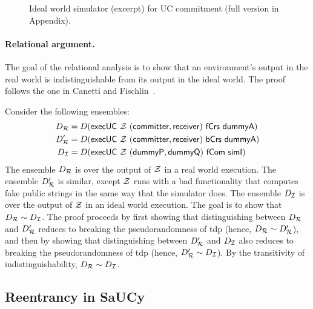 \begin{figure}

\caption{Ideal world simulator (excerpt) for UC commitment (full version in Appendix).}
\label{fig:sim-short}
\end{figure}


\paragraph{Relational argument.}
The goal of the relational analysis is to show that an environment's output in
the real world is indistinguishable from its output in the ideal world. The
proof follows the one in Canetti and Fischlin~\cite{canetti2001commitments}.

\begin{sketch}
  Consider the following ensembles:
  \begin{align*}
    D_{\mathcal{{R}}} &= D(\mathsf{execUC~\mathcal{{Z}}~(committer, receiver)~fCrs~dummyA})\\
    D_{\mathcal{{R}}}' &= D(\mathsf{execUC~\mathcal{{Z}}~(committer, receiver)~bCrs~dummyA})\\
    D_{\mathcal{{I}}} &= D(\mathsf{execUC~\mathcal{{Z}}~(dummyP, dummyQ)~fCom~simI})
  \end{align*}
  \noindent The ensemble $D_{\mathcal{{R}}}$ is over the output of $\mathcal{{Z}}$ in a real
  world execution. The ensemble $D_{\mathcal{{R}}}'$ is similar, except $\mathcal{{Z}}$ runs
  with a bad functionality that computes fake public strings in the same way
  that the simulator does. The ensemble $D_{\mathcal{{I}}}$ is over the output of
  $\mathcal{{Z}}$ in an ideal world execution. The goal is to show that $D_{\mathcal{{R}}} \sim
  D_{\mathcal{{I}}}$.
%  
  The proof proceeds by first showing that distinguishing between $D_{\mathcal{{R}}}$
  and $D_{\mathcal{{R}}}'$ reduces to breaking the pseudorandomness of \textsf{tdp}
  (hence, $D_{\mathcal{{R}}} \sim D_{\mathcal{{R}}}'$), and then by showing that distinguishing
  between $D_{\mathcal{{R}}}'$ and $D_{\mathcal{{I}}}$ also reduces to breaking the
  pseudorandomness of \textsf{tdp} (hence, $D_{\mathcal{{R}}}' \sim D_{\mathcal{{I}}}$). By the
  transitivity of indistinguishability, ${D_{\mathcal{{R}}} \sim D_{\mathcal{{I}}}}$.
\end{sketch}


\subsection{Reentrancy in SaUCy}
\label{subsec:reentrancy}

